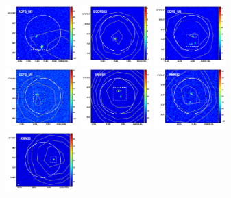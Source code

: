 \documentclass[iop]{emulateapj}
\begin{document}
\begin{figure}[!tbp]
\begin{centering}
\includegraphics[width=0.245\textwidth]{../Figures/overlays/ADFS_M0_870_250.pdf}
\includegraphics[width=0.245\textwidth]{../Figures/overlays/ECDFS02_870_250.pdf}
\includegraphics[width=0.245\textwidth]{../Figures/overlays/CDFS_M0_870_250.pdf}
\includegraphics[width=0.245\textwidth]{../Figures/overlays/CDFS_M1_870_250.pdf}
\includegraphics[width=0.245\textwidth]{../Figures/overlays/XMM01_870_250.pdf}
\includegraphics[width=0.245\textwidth]{../Figures/overlays/XMM02_870_250.pdf}
\includegraphics[width=0.245\textwidth]{../Figures/overlays/XMM03_870_250.pdf}

\end{centering}
\end{figure}
\end{document}
